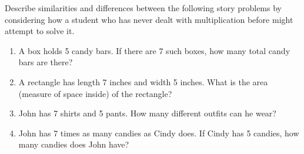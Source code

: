 \documentclass{ximera}
\begin{document}
Describe similarities and differences between the following story problems by considering how a student who has never dealt with multiplication before might attempt to solve it.
\begin{enumerate}
\item A box holds 5 candy bars.  If there are 7 such boxes, how many total candy bars are there?

\vfill

\item A rectangle has length 7 inches and width 5 inches.  What is the area (measure of space inside) of the rectangle?


\vfill


\item John has 7 shirts and 5 pants.  How many different outfits can he wear?


\vfill

\item John has 7 times as many candies as Cindy does.  If Cindy has 5 candies, how many candies does John have?

\vfill

\end{enumerate}
\end{document}

